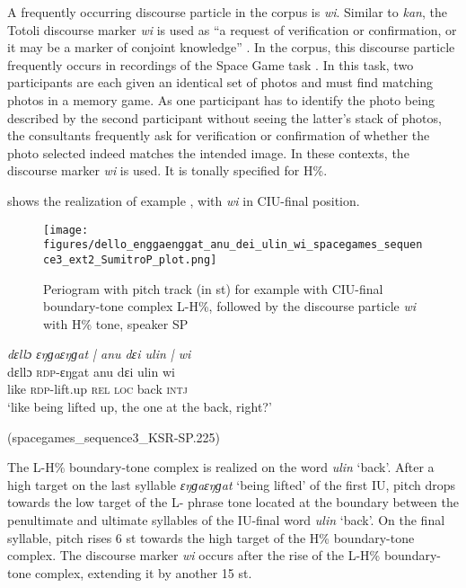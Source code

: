 A frequently occurring  discourse particle in the corpus is \textit{wi}. Similar to  \textit{kan}, the Totoli discourse marker \textit{wi} is used as “a request of verification or confirmation, or it may be a marker of conjoint knowledge” \citep[403]{Wouk1998}. In the corpus, this discourse particle frequently occurs in recordings of the Space Game task \citep{Levinson.1992c}.     In this task, two participants are each given an identical set of photos and must find matching photos in a memory game. As one participant has to identify the photo being described by the second participant without seeing the latter’s stack of photos, the consultants frequently ask for verification or confirmation of whether the photo selected indeed matches the intended image. In these contexts, the discourse marker \textit{wi} is used. It is tonally specified for H\%.

 shows the realization of example , with  \textit{wi} in CIU-final position. 


\begin{figure}
	\texttt{[image: figures/dello\_enggaenggat\_anu\_dei\_ulin\_wi\_spacegames\_sequence3\_ext2\_SumitroP\_plot.png]}
	\caption{Periogram with pitch track (in st) for example  with CIU-final boundary-tone complex L-H\%, followed by the discourse particle \textit{wi} with H\% tone, speaker SP}
	\label{pitch:dello enggaenggat anu dɛi ulin wi}
\end{figure}

\ea
\label{ex:dello enggaenggat anu dɛi ulin wi}
\textit{dɛllɔ ɛŋɡaɛŋɡat | anu dɛi ulin | wi} \\
\gll  dɛllɔ \textsc{rdp-}ɛŋgat anu dɛi ulin wi\\
like \textsc{rdp-}lift.up \textsc{rel} \textsc{loc} back \textsc{intj}\\ 
\glt ‘like being lifted up, the one at the back, right?’ \begin{flushright}(spacegames\_sequence3\_KSR-SP.225)
	\end{flushright}
\z



The L-H\% boundary-tone complex is realized on the word \textit{ulin} ‘back’. After a high target on the last syllable \textit{ɛŋɡaɛŋɡat} ‘being lifted’ of the first IU, pitch drops towards the low target of the L- phrase tone located at the boundary between the penultimate and ultimate syllables of the IU-final word \textit{ulin} ‘back’. On the final syllable, pitch rises 6 st towards the high target of the H\% boundary-tone complex. The discourse marker \textit{wi} occurs after the rise of the L-H\% boundary-tone complex, extending it by another 15 st.

